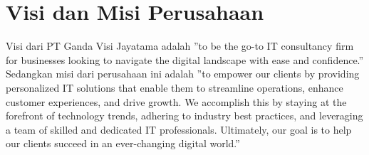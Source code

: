 
\section{Visi dan Misi Perusahaan}

Visi dari PT Ganda Visi Jayatama adalah ”to be the go-to IT consultancy firm
for businesses looking to navigate the digital landscape with ease and confidence.”
Sedangkan misi dari perusahaan ini adalah ”to empower our clients by providing
personalized IT solutions that enable them to streamline operations, enhance
customer experiences, and drive growth. We accomplish this by staying at the
forefront of technology trends, adhering to industry best practices, and leveraging
a team of skilled and dedicated IT professionals. Ultimately, our goal is to help our
clients succeed in an ever-changing digital world.”




